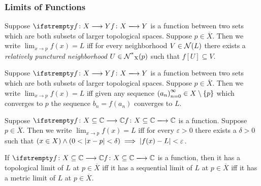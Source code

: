 \subsubsection{Limits of Functions}
\begin{definition}
Suppose $\fn{f}{X}{Y}$ is a function between two sets which are both subsets of larger topological spaces. Suppose $p \in \overline{X}$. Then we write $\lim_{x \to p} f(x) = L$ iff for every neighborhood $V \in \nbhd{L}$ there exists a \emph{relatively punctured neighborhood} $U \in \rpnbhd{p}{X}$ such that $f[U] \subseteq V$.
\end{definition}
\begin{definition}
Suppose $\fn{f}{X}{Y}$ is a function between two sets which are both subsets of larger topological spaces. Suppose $p \in \overline{X}$. Then we write $\lim_{x \to p} f(x) = L$ iff given any sequence $\seq{a} \in X\setminus \{p\}$ which converges to $p$ the sequence $b_n = f(a_n)$ converges to $L$.
\end{definition}
\begin{definition}
Suppose $\fn{f}{X\subseteq\C}{\C}$ is a function. Suppose $p \in \overline{X}$. Then we write $\lim_{x \to p} f(x) = L$ iff for every $\varepsilon > 0$ there exists a $\delta > 0$ such that $(x \in X) \land (0<\modulus{x-p}< \delta) \implies \modulus{f(x)-L} < \varepsilon$.
\end{definition}
\begin{theorem}
If $\fn{f}{X\subseteq\C}{\C}$ is a function, then it has a topological limit of $L$ at $p \in \overline{X}$ iff it has a sequential limit of $L$ at $p \in \overline{X}$ iff it has a metric limit of $L$ at $p \in \overline{X}$.
\end{theorem}
